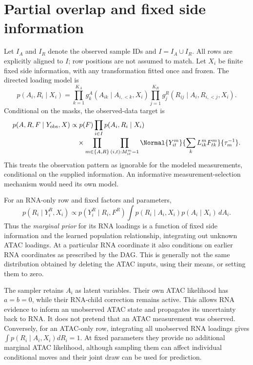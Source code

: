 \section{Partial overlap and fixed side information}
\label{sec:partialoverlap}
Let \(I_A\) and \(I_R\) denote the observed sample IDs and
\(I=I_A\cup I_R\). All rows are explicitly aligned to \(I\); row positions
are not assumed to match. Let \(X_i\) be finite fixed side information,
with any transformation fitted once and frozen. The directed loading
model is
\begin{equation}
p(A_i,R_i\mid X_i)=
\prod_{k=1}^{K_A}g^A_k(A_{ik}\mid A_{i,<k},X_i)
\prod_{j=1}^{K_R}g^R_j(R_{ij}\mid A_i,R_{i,<j},X_i).
\end{equation}
Conditional on the masks, the observed-data target is
\begin{align}
p(A,R,F\mid Y_{\rm obs},X)
&\propto p(F)\prod_{i\in I}p(A_i,R_i\mid X_i)\nonumber\\[-2pt]
&\quad{}\times\prod_{m\in\{A,R\}}\prod_{(i,t):M^m_{it}=1}
\Normal{Y^m_{it}}{\sum_kL^m_{ik}F^m_{tk}}{\tau_m^{-1}}.
\label{eq:partialtarget}
\end{align}
This treats the observation pattern as ignorable for the modeled
measurements, conditional on the supplied information. An informative
measurement-selection mechanism would need its own model.

For an RNA-only row and fixed factors and parameters,
\begin{equation}
p(R_i\mid Y^R_i,X_i)
\propto p(Y^R_i\mid R_i,F^R)
\int p(R_i\mid A_i,X_i)p(A_i\mid X_i)\,dA_i.
\label{eq:missingatac}
\end{equation}
Thus the \emph{marginal prior} for its RNA loadings is a function of fixed
side information and the learned population relationship, integrating out
unknown ATAC loadings. At a particular RNA coordinate it also conditions
on earlier RNA coordinates as prescribed by the DAG. This is generally
not the same distribution obtained by deleting the ATAC inputs, using
their means, or setting them to zero.

The sampler retains \(A_i\) as latent variables. Their own ATAC likelihood
has \(a=b=0\), while their RNA-child correction remains active. This
allows RNA evidence to inform an unobserved ATAC state and propagates its
uncertainty back to RNA. It does not pretend that an ATAC measurement was
observed. Conversely, for an ATAC-only row, integrating all unobserved RNA
loadings gives
\(\int p(R_i\mid A_i,X_i)dR_i=1\).
At fixed parameters they provide no additional marginal ATAC likelihood,
although sampling them can affect individual conditional moves and
their joint draw can be used for prediction.

